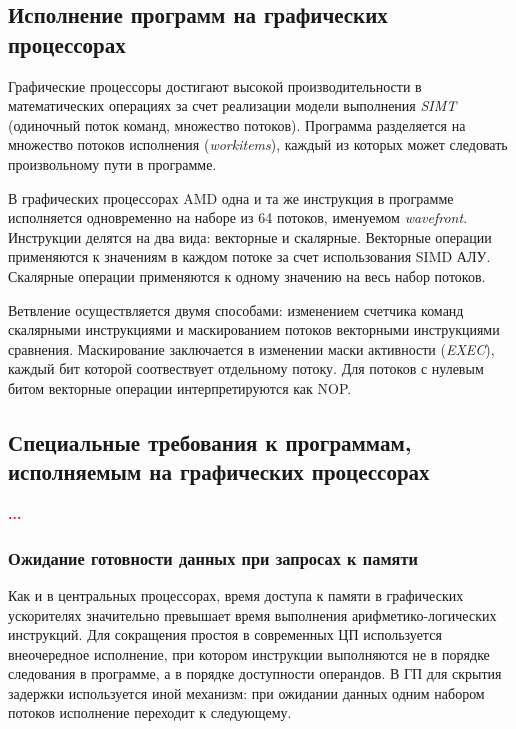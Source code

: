 \documentclass[a4paper,14pt]{extarticle}
\newcommand{\todo}[1]{\textbf{\textcolor{red}{#1}}}
\begin{document}
\subsection{Исполнение программ на графических процессорах}

Графические процессоры достигают высокой производительности в математических операциях
за счет реализации модели выполнения \textit{SIMT} (одиночный поток команд, множество потоков).
Программа разделяется на множество потоков исполнения (\textit{workitems}),
каждый из которых может следовать произвольному пути в программе.

В графических процессорах AMD одна и та же инструкция в программе исполняется одновременно
на наборе из 64 потоков, именуемом \textit{wavefront}. Инструкции делятся на два вида:
векторные и скалярные. Векторные операции применяются к значениям в каждом потоке
за счет использования SIMD АЛУ. Скалярные операции применяются к одному значению на весь набор
потоков.

Ветвление осуществляется двумя способами: изменением счетчика команд скалярными инструкциями
и маскированием потоков векторными инструкциями сравнения. Маскирование заключается в изменении
маски активности (\textit{EXEC}), каждый бит которой соотвествует отдельному потоку.
Для потоков с нулевым битом векторные операции интерпретируются как NOP.

\subsection{Специальные требования к программам, исполняемым на графических процессорах}

\todo{...}

\subsubsection{Ожидание готовности данных при запросах к памяти}

Как и в центральных процессорах, время доступа к памяти в графических ускорителях
значительно превышает время выполнения арифметико-логических инструкций.
Для сокращения простоя в современных ЦП используется внеочередное исполнение, при котором
инструкции выполняются не в порядке следования в программе, а в порядке доступности операндов.
В ГП для скрытия задержки используется иной механизм: при ожидании данных одним набором
потоков исполнение переходит к следующему.
\end{document}
